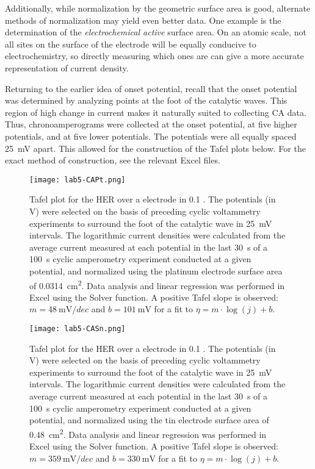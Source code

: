 \documentclass[../labs.tex]{subfiles}
\begin{document}
Additionally, while normalization by the geometric surface area is good, alternate methods of normalization may yield even better data. One example is the determination of the \emph{electrochemical active} surface area.\supercite{bib:EASA} On an atomic scale, not all sites on the surface of the electrode will be equally conducive to electrochemistry, so directly measuring which ones are can give a more accurate representation of current density.\par
Returning to the earlier idea of onset potential, recall that the onset potential was determined by analyzing points at the foot of the catalytic waves. This region of high change in current makes it naturally suited to collecting CA data. Thus, chronoamperograms were collected at the onset potential, at five higher potentials, and at five lower potentials. The potentials were all equally spaced \SI{25}{\milli\volt} apart. This allowed for the construction of the Tafel plots below. For the exact method of construction, see the relevant Excel files.

\begin{figure}[H]
    \centering
    \texttt{[image: lab5-CAPt.png]}
    \caption{Tafel plot for the HER over a  electrode in \SI{0.1}{\molar} . The potentials (in \si{\volt}) were selected on the basis of preceding cyclic voltammetry experiments to surround the foot of the catalytic wave in \SI{25}{\milli\volt} intervals. The logarithmic current densities were calculated from the average current measured at each potential in the last \SI{30}{\second} of a \SI{100}{\second} cyclic amperometry experiment conducted at a given potential, and normalized using the platinum electrode surface area of \SI{0.0314}{\centi\meter\squared}. Data analysis and linear regression was performed in Excel using the Solver function. A positive Tafel slope is observed: $m=\SI{48}{\milli\volt/dec}$ and $b=\SI{101}{\milli\volt}$ for a fit to $\eta=m\cdot\log(j)+b$.}
    \label{fig:CAPt}
\end{figure}

\begin{figure}[H]
    \centering
    \texttt{[image: lab5-CASn.png]}
    \caption{Tafel plot for the HER over a  electrode in \SI{0.1}{\molar} . The potentials (in \si{\volt}) were selected on the basis of preceding cyclic voltammetry experiments to surround the foot of the catalytic wave in \SI{25}{\milli\volt} intervals. The logarithmic current densities were calculated from the average current measured at each potential in the last \SI{30}{\second} of a \SI{100}{\second} cyclic amperometry experiment conducted at a given potential, and normalized using the tin electrode surface area of \SI{0.48}{\centi\meter\squared}. Data analysis and linear regression was performed in Excel using the Solver function. A positive Tafel slope is observed: $m=\SI{359}{\milli\volt/dec}$ and $b=\SI{330}{\milli\volt}$ for a fit to $\eta=m\cdot\log(j)+b$.}
    \label{fig:CASn}
\end{figure}
\end{document}
